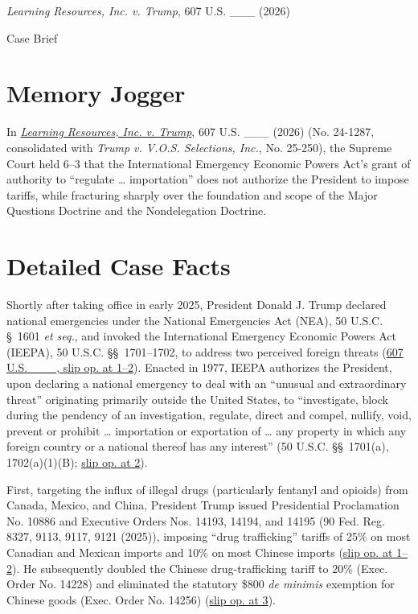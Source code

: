 \documentclass[12pt]{article}
\begin{document}
\begin{center}
{\LARGE \textit{Learning Resources, Inc. v. Trump}, 607 U.S. \_\_\_ (2026)\par}
\vspace{0.8em}
{\large Case Brief\par}
\end{center}
\vspace{1em}

\section{Memory Jogger}
In \href{https://www.courtlistener.com/opinion/10799354/learning-resources-inc-v-trump-revisions-22326/}{\textit{Learning Resources, Inc. v. Trump}}, 607 U.S. \_\_\_ (2026) (No. 24-1287, consolidated with \textit{Trump v. V.O.S. Selections, Inc.}, No. 25-250), the Supreme Court held 6--3 that the International Emergency Economic Powers Act's grant of authority to ``regulate \ldots{} importation'' does not authorize the President to impose tariffs, while fracturing sharply over the foundation and scope of the Major Questions Doctrine and the Nondelegation Doctrine.

\section{Detailed Case Facts}
Shortly after taking office in early 2025, President Donald J. Trump declared national emergencies under the National Emergencies Act (NEA), 50 U.S.C. \S~1601 \textit{et seq.}, and invoked the International Emergency Economic Powers Act (IEEPA), 50 U.S.C. \S\S~1701--1702, to address two perceived foreign threats (\href{https://www.law.cornell.edu/supremecourt/text/24-1287}{607 U.S. \_\_\_, slip op. at 1--2}). Enacted in 1977, IEEPA authorizes the President, upon declaring a national emergency to deal with an ``unusual and extraordinary threat'' originating primarily outside the United States, to ``investigate, block during the pendency of an investigation, regulate, direct and compel, nullify, void, prevent or prohibit \ldots{} importation or exportation of \ldots{} any property in which any foreign country or a national thereof has any interest'' (50 U.S.C. \S\S~1701(a), 1702(a)(1)(B); \href{https://www.law.cornell.edu/supremecourt/text/24-1287}{slip op. at 2}).

First, targeting the influx of illegal drugs (particularly fentanyl and opioids) from Canada, Mexico, and China, President Trump issued Presidential Proclamation No. 10886 and Executive Orders Nos. 14193, 14194, and 14195 (90 Fed. Reg. 8327, 9113, 9117, 9121 (2025)), imposing ``drug trafficking'' tariffs of 25\% on most Canadian and Mexican imports and 10\% on most Chinese imports (\href{https://www.law.cornell.edu/supremecourt/text/24-1287}{slip op. at 1--2}). He subsequently doubled the Chinese drug-trafficking tariff to 20\% (Exec. Order No. 14228) and eliminated the statutory \$800 \textit{de minimis} exemption for Chinese goods (Exec. Order No. 14256) (\href{https://www.law.cornell.edu/supremecourt/text/24-1287}{slip op. at 3}).
\end{document}
